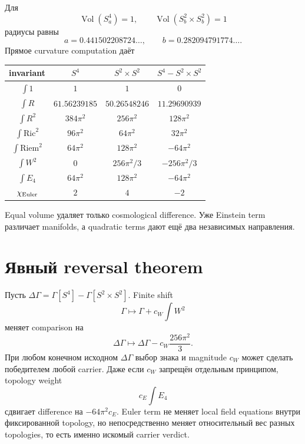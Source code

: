 Для
\begin{equation}
 \operatorname{Vol}(S^4_a)=1,
 \qquad
 \operatorname{Vol}(S^2_b\times S^2_b)=1
\end{equation}
радиусы равны
\begin{equation}
 a=0.441502208724\ldots,
 \qquad
 b=0.282094791774\ldots.
\end{equation}
Прямое curvature computation даёт
\begin{center}
\begin{tabular}{c|cc|c}
 invariant & \(S^4\) & \(S^2\times S^2\) & \(S^4-S^2\times S^2\)\\
\hline
\(\int1\) & \(1\) & \(1\) & \(0\)\\
\(\int R\) & \(61.56239185\) & \(50.26548246\) & \(11.29690939\)\\
\(\int R^2\) & \(384\pi^2\) & \(256\pi^2\) & \(128\pi^2\)\\
\(\int \mathrm{Ric}^2\) & \(96\pi^2\) & \(64\pi^2\) & \(32\pi^2\)\\
\(\int \mathrm{Riem}^2\) & \(64\pi^2\) & \(128\pi^2\) & \(-64\pi^2\)\\
\(\int W^2\) & \(0\) & \(256\pi^2/3\) & \(-256\pi^2/3\)\\
\(\int E_4\) & \(64\pi^2\) & \(128\pi^2\) & \(-64\pi^2\)\\
\(\chi_{\rm Euler}\) & \(2\) & \(4\) & \(-2\)\\
\end{tabular}
\end{center}
Equal volume удаляет только cosmological difference. Уже Einstein term
различает manifolds, а quadratic terms дают ещё два независимых направления.

\section{Явный reversal theorem}

Пусть \(\Delta\Gamma=\Gamma[S^4]-\Gamma[S^2\times S^2]\). Finite shift
\begin{equation}
 \Gamma\longmapsto\Gamma+c_W\int W^2
\end{equation}
меняет comparison на
\begin{equation}
 \Delta\Gamma\longmapsto
 \Delta\Gamma-c_W\frac{256\pi^2}{3}.
\end{equation}
При любом конечном исходном \(\Delta\Gamma\) выбор знака и magnitude
\(c_W\) может сделать победителем любой carrier. Даже если \(c_W\)
запрещён отдельным принципом, topology weight
\begin{equation}
 c_E\int E_4
\end{equation}
сдвигает difference на \(-64\pi^2c_E\). Euler term не меняет local field
equations внутри фиксированной topology, но непосредственно меняет
относительный вес разных topologies, то есть именно искомый carrier verdict.

